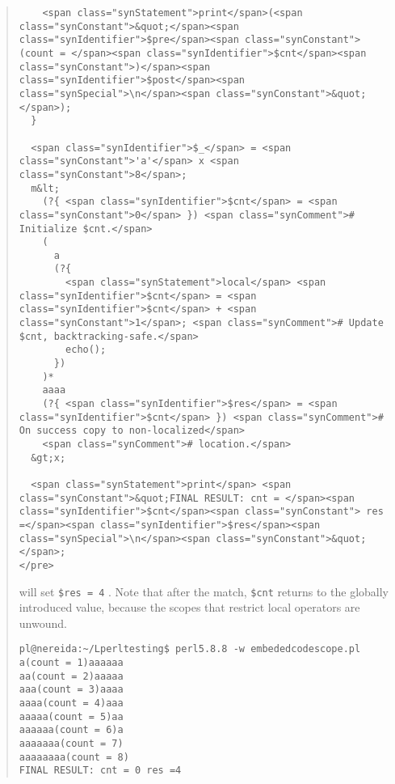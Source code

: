 \begin{it}
\begin{quote}
\begin{verbatim}
    <span class="synStatement">print</span>(<span class="synConstant">&quot;</span><span class="synIdentifier">$pre</span><span class="synConstant">(count = </span><span class="synIdentifier">$cnt</span><span class="synConstant">)</span><span class="synIdentifier">$post</span><span class="synSpecial">\n</span><span class="synConstant">&quot;</span>);
  }

  <span class="synIdentifier">$_</span> = <span class="synConstant">'a'</span> x <span class="synConstant">8</span>;
  m&lt;
    (?{ <span class="synIdentifier">$cnt</span> = <span class="synConstant">0</span> }) <span class="synComment"># Initialize $cnt.</span>
    (
      a
      (?{
        <span class="synStatement">local</span> <span class="synIdentifier">$cnt</span> = <span class="synIdentifier">$cnt</span> + <span class="synConstant">1</span>; <span class="synComment"># Update $cnt, backtracking-safe.</span>
        echo();
      })
    )*
    aaaa
    (?{ <span class="synIdentifier">$res</span> = <span class="synIdentifier">$cnt</span> }) <span class="synComment"># On success copy to non-localized</span>
    <span class="synComment"># location.</span>
  &gt;x;

  <span class="synStatement">print</span> <span class="synConstant">&quot;FINAL RESULT: cnt = </span><span class="synIdentifier">$cnt</span><span class="synConstant"> res =</span><span class="synIdentifier">$res</span><span class="synSpecial">\n</span><span class="synConstant">&quot;</span>;
</pre>

\end{verbatim}

will set \verb|$res = 4| . Note that after the match, \verb|$cnt| returns to the
globally introduced value, because the scopes that restrict local
operators are unwound.
\begin{verbatim}
pl@nereida:~/Lperltesting$ perl5.8.8 -w embededcodescope.pl
a(count = 1)aaaaaa
aa(count = 2)aaaaa
aaa(count = 3)aaaa
aaaa(count = 4)aaa
aaaaa(count = 5)aa
aaaaaa(count = 6)a
aaaaaaa(count = 7)
aaaaaaaa(count = 8)
FINAL RESULT: cnt = 0 res =4
\end{verbatim}
\end{quote}\end{it}



